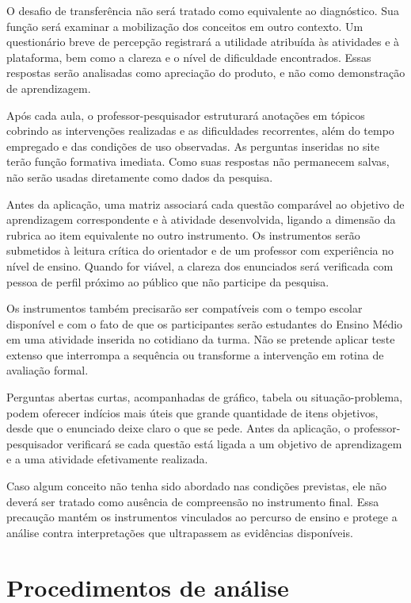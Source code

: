 O desafio de transferência não será tratado como equivalente ao diagnóstico. Sua função será examinar a mobilização dos conceitos em outro contexto. Um questionário breve de percepção registrará a utilidade atribuída às atividades e à plataforma, bem como a clareza e o nível de dificuldade encontrados. Essas respostas serão analisadas como apreciação do produto, e não como demonstração de aprendizagem.

Após cada aula, o professor-pesquisador estruturará anotações em tópicos cobrindo as intervenções realizadas e as dificuldades recorrentes, além do tempo empregado e das condições de uso observadas. As perguntas inseridas no site terão função formativa imediata. Como suas respostas não permanecem salvas, não serão usadas diretamente como dados da pesquisa.

Antes da aplicação, uma matriz associará cada questão comparável ao objetivo de aprendizagem correspondente e à atividade desenvolvida, ligando a dimensão da rubrica ao item equivalente no outro instrumento. Os instrumentos serão submetidos à leitura crítica do orientador e de um professor com experiência no nível de ensino. Quando for viável, a clareza dos enunciados será verificada com pessoa de perfil próximo ao público que não participe da pesquisa.

Os instrumentos também precisarão ser compatíveis com o tempo escolar disponível e com o fato de que os participantes serão estudantes do Ensino Médio em uma atividade inserida no cotidiano da turma. Não se pretende aplicar teste extenso que interrompa a sequência ou transforme a intervenção em rotina de avaliação formal.

Perguntas abertas curtas, acompanhadas de gráfico, tabela ou situação-problema, podem oferecer indícios mais úteis que grande quantidade de itens objetivos, desde que o enunciado deixe claro o que se pede. Antes da aplicação, o professor-pesquisador verificará se cada questão está ligada a um objetivo de aprendizagem e a uma atividade efetivamente realizada.

Caso algum conceito não tenha sido abordado nas condições previstas, ele não deverá ser tratado como ausência de compreensão no instrumento final. Essa precaução mantém os instrumentos vinculados ao percurso de ensino e protege a análise contra interpretações que ultrapassem as evidências disponíveis.

\section{Procedimentos de análise}

